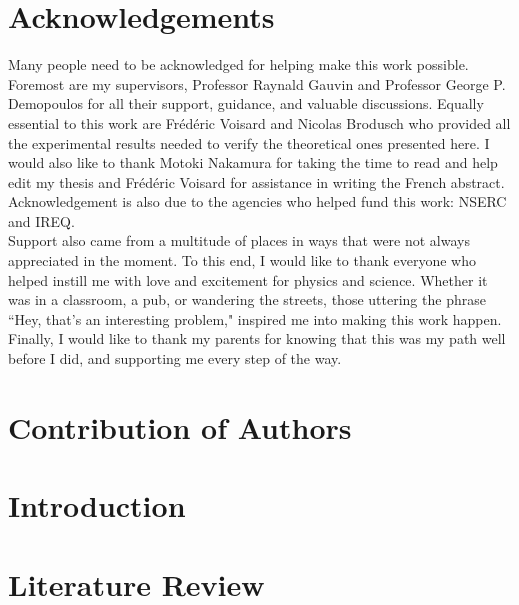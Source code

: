 \documentclass[12pt]{report}
\begin{document}
\chapter*{Acknowledgements}
Many people need to be acknowledged for helping make this work possible.  Foremost are my supervisors,  Professor Raynald Gauvin and  Professor George P. Demopoulos for all their support, guidance, and valuable discussions.  Equally essential to this work are Fr\'ed\'eric Voisard and Nicolas Brodusch who provided all the experimental results needed to verify the theoretical ones presented here. I would also like to thank Motoki Nakamura  for taking the time to read and help edit my thesis and Fr\'ed\'eric Voisard for assistance in writing the French abstract. Acknowledgement is also due to the agencies who helped fund this work: NSERC and IREQ.  \\

Support also came from a multitude of places in ways that were not always appreciated in the moment.  To this end, I would like to thank everyone who helped instill me with love and excitement for physics and science.  Whether it was in a classroom, a pub, or wandering the streets, those uttering the phrase ``Hey, that's an interesting problem," inspired me into making this work happen. Finally, I would like to thank my parents for knowing that this was my path well before I did, and supporting me every step of the way. 




\chapter*{Contribution of Authors}











\chapter{Introduction}
\renewcommand{\thepage}{\arabic{page}}%
\setcounter{page}{1}%




\chapter{Literature Review}\label{literature_review}

\end{document}
